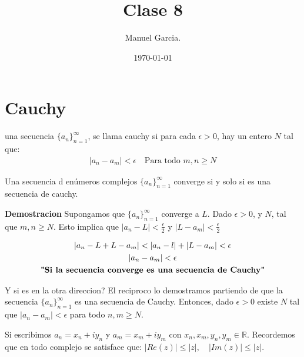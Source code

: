 \documentclass{article}
\title{Clase 8}
\author{Manuel Garcia.}
\date{\today}
\newcommand{\caja}[3]{%
  \begin{tcolorbox}[colback=#1!5!white,colframe=#1!25!black,title=#2]
    #3
  \end{tcolorbox}%
}
\begin{document}
\maketitle

\section{Cauchy }
\caja{green}{Definición }{
  una secuencia $ \{a_n \}_{n= 1 } ^ {\infty} $, se llama cauchy si para cada $ \epsilon >0  $, hay un entero $ N  $ tal que: 
  \begin{gather*}
    \left|a_n - a_m \right|<\epsilon \quad \text{Para todo }m,n \geq N
  \end{gather*}
}
\caja{green}{Teorema }{
  Una secuencia d enúmeros complejos $ \{a_n \}_{n=1 } ^ {\infty} $ converge si y solo si es una secuencia de cauchy.
}
\textbf{Demostracion } Supongamos que $ \{a_n \}_{n=1 } ^ {\infty} $ converge a $ L  $. Dado $ \epsilon>0  $, y $ N  $, tal que $ m,n \geq N  $. Esto implica que $ \left|a_n - L \right|<\frac{\epsilon}{2} $ y $ \left|L-a_m \right|<\frac{\epsilon}{2} $

\begin{gather*}
  \left|a_n - L + L - a_m \right| < \left|a_n -l \right|+ \left|L-a_m \right|<\epsilon\\
  \left|a_n - a_m \right|< \epsilon\\
  \text{\textbf{"Si la secuencia converge es una secuencia de Cauchy"}}
\end{gather*}

Y si es en la otra direccion? 
El reciproco lo demostramos partiendo de que la secuencia $ \{a_n \} _{n=1 } ^ {\infty} $ es una secuencia de Cauchy. Entonces, dado $ \epsilon>0  $ existe $ N  $ tal que $ \left|a_n - a_m \right|<\epsilon $ para todo $ n,m \geq N  $.

Si escribimos $ a_n = x_n + i y_n  $ y $ a_m  = x_m + i y_m  $ con $ x_n,x_m,y_n,y_m \in \mathbb{R} $. Recordemos que en todo complejo se satisface que: $ \left|Re(z )\right|\leq \left|z \right|, \quad \left|Im(z) \right|\leq \left|z \right| $.
\end{document}
